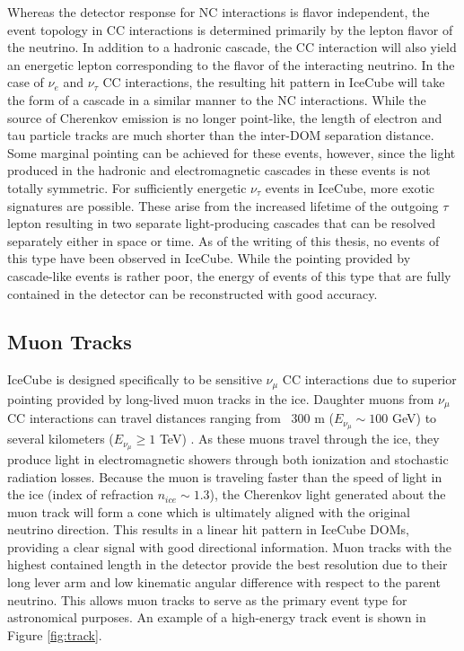 \documentclass{gatech-thesis}
\begin{document}
Whereas the detector response for NC interactions is flavor independent, the event topology in CC interactions is determined primarily by the lepton flavor of the neutrino. In addition to a hadronic cascade, the CC interaction will also yield an energetic lepton corresponding to the flavor of the interacting neutrino. In the case of $\nu_{e}$ and $\nu_{\tau}$ CC interactions, the resulting hit pattern in IceCube will take the form of a cascade in a similar manner to the NC interactions. While the source of Cherenkov emission is no longer point-like, the length of electron and tau particle tracks are much shorter than the inter-DOM separation distance. Some marginal pointing can be achieved for these events, however, since the light produced in the hadronic and electromagnetic cascades in these events is not totally symmetric. For sufficiently energetic $\nu_{\tau}$ events in IceCube, more exotic signatures are possible. These arise from the increased lifetime of the outgoing $\tau$ lepton resulting in two separate light-producing cascades that can be resolved separately either in space or time. As of the writing of this thesis, no events of this type have been observed in IceCube. While the pointing provided by cascade-like events is rather poor, the energy of events of this type that are fully contained in the detector can be reconstructed with good accuracy. 

\subsection{Muon Tracks}
IceCube is designed specifically to be sensitive $\nu_{\mu}$ CC interactions due to superior pointing provided by long-lived muon tracks in the ice. Daughter muons from $\nu_{\mu}$ CC interactions can travel distances ranging from ~300 m ($E_{\nu_{\mu}}\sim 100$ GeV) to several kilometers ($E_{\nu_{\mu}}\geq 1$ TeV) \cite{2001PhRvD..63i4020I}. As these muons travel through the ice, they produce light in electromagnetic showers through both ionization and stochastic radiation losses. Because the muon is traveling faster than the speed of light in the ice (index of refraction $n_{ice} \sim 1.3$), the Cherenkov light generated about the muon track will form a cone which is ultimately aligned with the original neutrino direction. This results in a linear hit pattern in IceCube DOMs, providing a clear signal with good directional information. Muon tracks with the highest contained length in the detector provide the best resolution due to their long lever arm and low kinematic angular difference with respect to the parent neutrino. This allows muon tracks to serve as the primary event type for astronomical purposes. An example of a high-energy track event is shown in Figure \ref{fig:track}.
\end{document}

